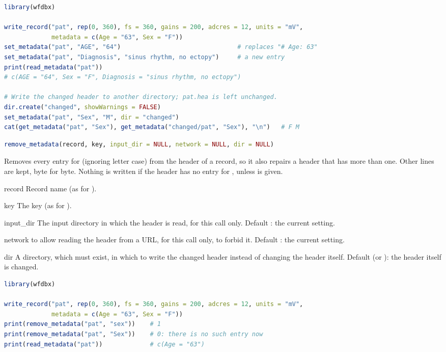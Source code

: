 \begin{lstlisting}[language=R,style=example]
library(wfdbx)

write_record("pat", rep(0, 360), fs = 360, gains = 200, adcres = 12, units = "mV",
             metadata = c(Age = "63", Sex = "F"))
set_metadata("pat", "AGE", "64")                                # replaces "# Age: 63"
set_metadata("pat", "Diagnosis", "sinus rhythm, no ectopy")     # a new entry
print(read_metadata("pat"))
# c(AGE = "64", Sex = "F", Diagnosis = "sinus rhythm, no ectopy")

# Write the changed header to another directory; pat.hea is left unchanged.
dir.create("changed", showWarnings = FALSE)
set_metadata("pat", "Sex", "M", dir = "changed")
cat(get_metadata("pat", "Sex"), get_metadata("changed/pat", "Sex"), "\n")   # F M
\end{lstlisting}

\begin{lstlisting}[language=R,style=signature]
remove_metadata(record, key, input_dir = NULL, network = NULL, dir = NULL)
\end{lstlisting}
Removes every entry for  (ignoring letter case) from the header of a record, so
it also repairs a header that has more than one. Other lines are kept, byte for byte.
Nothing is written if the header has no entry for , unless  is given.
\begin{params}
\item[record] Record name (as for ).
\item[key] The key (as for ).
\item[input\_dir] The input directory in which the header is read, for this call only.
  Default : the current setting.
\item[network]  to allow reading the header from a URL, for this call only,
   to forbid it. Default : the current setting.
\item[dir] A directory, which must exist, in which to write the changed header instead of
  changing the header itself. Default  (or ): the header itself is
  changed.
\end{params}
\begin{lstlisting}[language=R,style=example]
library(wfdbx)

write_record("pat", rep(0, 360), fs = 360, gains = 200, adcres = 12, units = "mV",
             metadata = c(Age = "63", Sex = "F"))
print(remove_metadata("pat", "sex"))    # 1
print(remove_metadata("pat", "Sex"))    # 0: there is no such entry now
print(read_metadata("pat"))             # c(Age = "63")
\end{lstlisting}

